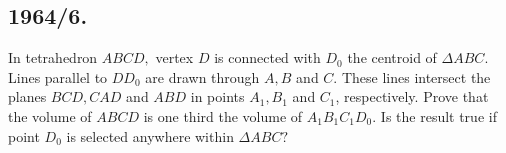 \documentclass[12pt,thmsa]{article}
\begin{document}
\subsection{1964/6.}

In tetrahedron $ABCD,$ vertex $D$ is connected with $D_{0}$ the centroid of $%
\Delta ABC.$ Lines parallel to $DD_{0}$ are drawn through $A,B$ and $C.$
These lines intersect the planes $BCD,CAD$ and $ABD$ in points $A_{1},B_{1}$
and $C_{1}$, respectively. Prove that the volume of $ABCD$ is one third the
volume of $A_{1}B_{1}C_{1}D_{0}.$ Is the result true if point $D_{0}$ is
selected anywhere within $\Delta ABC?$
\end{document}
